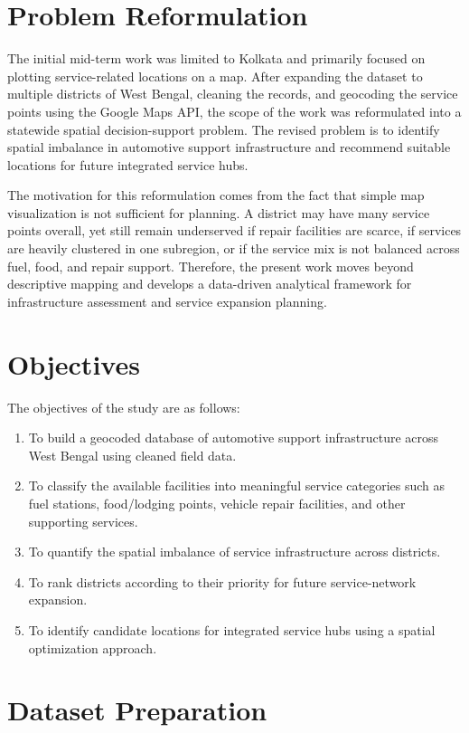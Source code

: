 \section{Problem Reformulation}

The initial mid-term work was limited to Kolkata and primarily focused on plotting service-related locations on a map. After expanding the dataset to multiple districts of West Bengal, cleaning the records, and geocoding the service points using the Google Maps API, the scope of the work was reformulated into a statewide spatial decision-support problem. The revised problem is to identify spatial imbalance in automotive support infrastructure and recommend suitable locations for future integrated service hubs.

The motivation for this reformulation comes from the fact that simple map visualization is not sufficient for planning. A district may have many service points overall, yet still remain underserved if repair facilities are scarce, if services are heavily clustered in one subregion, or if the service mix is not balanced across fuel, food, and repair support. Therefore, the present work moves beyond descriptive mapping and develops a data-driven analytical framework for infrastructure assessment and service expansion planning.

\section{Objectives}

The objectives of the study are as follows:
\begin{enumerate}
    \item To build a geocoded database of automotive support infrastructure across West Bengal using cleaned field data.
    \item To classify the available facilities into meaningful service categories such as fuel stations, food/lodging points, vehicle repair facilities, and other supporting services.
    \item To quantify the spatial imbalance of service infrastructure across districts.
    \item To rank districts according to their priority for future service-network expansion.
    \item To identify candidate locations for integrated service hubs using a spatial optimization approach.
\end{enumerate}

\section{Dataset Preparation}

